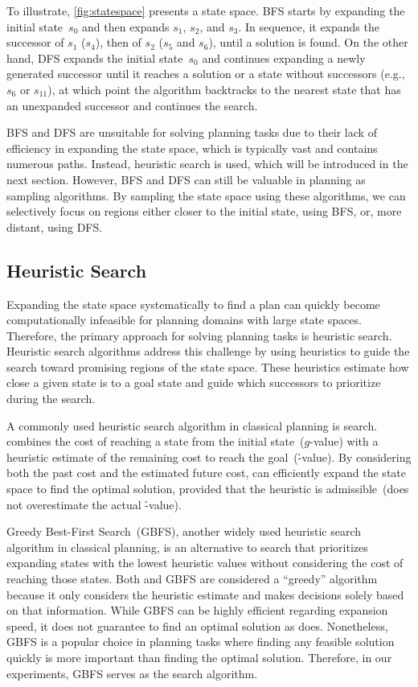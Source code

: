 To illustrate, \cref{fig:statespace} presents a state space. BFS starts by expanding the initial state~$s_0$ and then expands $s_1$, $s_2$, and $s_3$. In sequence, it expands the successor of $s_1$ ($s_4$), then of $s_2$ ($s_5$ and $s_6$), until a solution is found. On the other hand, DFS expands the initial state~$s_0$ and continues expanding a newly generated successor until it reaches a solution or a state without successors (e.g.,~$s_6$ or $s_{11}$), at which point the algorithm backtracks to the nearest state that has an unexpanded successor and continues the search.

BFS and DFS are unsuitable for solving planning tasks due to their lack of efficiency in expanding the state space, which is typically vast and contains numerous paths. Instead, heuristic search is used, which will be introduced in the next section. However, BFS and DFS can still be valuable in planning as sampling algorithms. By sampling the state space using these algorithms, we can selectively focus on regions either closer to the initial state, using BFS, or, more distant, using DFS.

\subsection{Heuristic Search}
\label{sec:heuristic-search}

Expanding the state space systematically to find a plan can quickly become computationally infeasible for planning domains with large state spaces. Therefore, the primary approach for solving planning tasks is heuristic search. Heuristic search algorithms address this challenge by using heuristics to guide the search toward promising regions of the state space. These heuristics estimate how close a given state is to a goal state and guide which successors to prioritize during the search.

A commonly used heuristic search algorithm in classical planning is \astar search. \astar combines the cost of reaching a state from the initial state~($g$-value) with a heuristic estimate of the remaining cost to reach the goal~(\h-value). By considering both the past cost and the estimated future cost, \astar can efficiently expand the state space to find the optimal solution, provided that the heuristic is admissible~(does not overestimate the actual \h-value).

Greedy Best-First Search~(GBFS), another widely used heuristic search algorithm in classical planning, is an alternative to \astar search that prioritizes expanding states with the lowest heuristic values without considering the cost of reaching those states. Both \astar and GBFS are considered a ``greedy'' algorithm because it only considers the heuristic estimate and makes decisions solely based on that information. While GBFS can be highly efficient regarding expansion speed, it does not guarantee to find an optimal solution as \astar does. Nonetheless, GBFS is a popular choice in planning tasks where finding any feasible solution quickly is more important than finding the optimal solution. Therefore, in our experiments, GBFS serves as the search algorithm.

